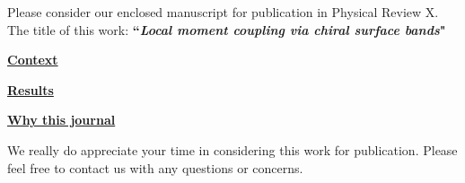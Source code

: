 \documentclass[10pt,stdletter,dateno,sigleft]{newlfm}
\begin{document}
\begin{newlfm}


Please consider our enclosed manuscript for publication in Physical Review
X. The title of this work: \textbf{``\textit{Local moment coupling via chiral surface bands}"}

\vspace{0.1cm}
\underline{\textbf{Context}} 


\vspace{0.1cm}
\underline{\textbf{Results}} 



\vspace{0.1cm}

\underline{\textbf{Why this journal}} 



\vspace{1.0cm}

We really do appreciate your time in considering this work for publication.
Please feel free to contact us with any questions or concerns. 
 

\end{newlfm}
\end{document}
